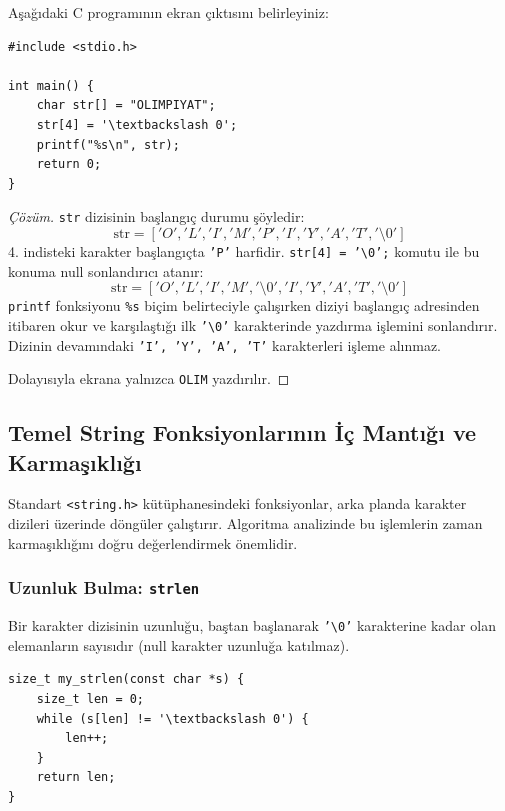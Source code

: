 \begin{example}
Aşağıdaki C programının ekran çıktısını belirleyiniz:
\begin{lstlisting}[language=CTemel]
#include <stdio.h>

int main() {
    char str[] = "OLIMPIYAT";
    str[4] = '\textbackslash 0';
    printf("%s\n", str);
    return 0;
}
\end{lstlisting}
\end{example}

\begin{proof}[Çözüm]
\texttt{str} dizisinin başlangıç durumu şöyledir:
\[
\text{str} = ['O', 'L', 'I', 'M', 'P', 'I', 'Y', 'A', 'T', '\setminus 0']
\]
4. indisteki karakter başlangıçta \texttt{'P'} harfidir. \texttt{str[4] = '\textbackslash 0';} komutu ile bu konuma null sonlandırıcı atanır:
\[
\text{str} = ['O', 'L', 'I', 'M', '\setminus 0', 'I', 'Y', 'A', 'T', '\setminus 0']
\]
\texttt{printf} fonksiyonu \texttt{\%s} biçim belirteciyle çalışırken diziyi başlangıç adresinden itibaren okur ve karşılaştığı ilk \texttt{'\textbackslash 0'} karakterinde yazdırma işlemini sonlandırır. Dizinin devamındaki \texttt{'I', 'Y', 'A', 'T'} karakterleri işleme alınmaz.

Dolayısıyla ekrana yalnızca \texttt{OLIM} yazdırılır.
\end{proof}

\subsection{Temel String Fonksiyonlarının İç Mantığı ve Karmaşıklığı}

Standart \texttt{<string.h>} kütüphanesindeki fonksiyonlar, arka planda karakter dizileri üzerinde döngüler çalıştırır. Algoritma analizinde bu işlemlerin zaman karmaşıklığını doğru değerlendirmek önemlidir.

\subsubsection{Uzunluk Bulma: \texttt{strlen}}

Bir karakter dizisinin uzunluğu, baştan başlanarak \texttt{'\textbackslash 0'} karakterine kadar olan elemanların sayısıdır (null karakter uzunluğa katılmaz).

\begin{lstlisting}[language=CTemel]
size_t my_strlen(const char *s) {
    size_t len = 0;
    while (s[len] != '\textbackslash 0') {
        len++;
    }
    return len;
}
\end{lstlisting}

